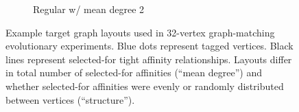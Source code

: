 \begin{figure}[!htbp]
\begin{center}
\begin{minipage}{0.95\textwidth}
\begin{minipage}{\textwidth}
\begin{minipage}{0.95\linewidth}
\begin{subfigure}[b]{0.5\textwidth}
\caption{
Regular w/ mean degree 2
}
\label{fig:regular_degree_2}
\label{fig:regular_2}
\end{subfigure}
\end{minipage}
\end{minipage}
\end{minipage}

\caption{
Example target graph layouts used in 32-vertex graph-matching evolutionary experiments.
Blue dots represent tagged vertices.
Black lines represent selected-for tight affinity relationships.
Layouts differ in total number of selected-for affinities (``mean degree'') and whether selected-for affinities were evenly or randomly distributed between vertices (``structure'').
}
\label{fig:graph_layouts}


\end{center}
\end{figure}
